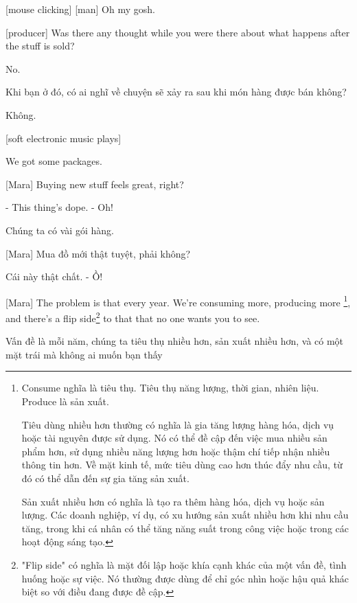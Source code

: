 \documentclass[a4paper]{article}
\begin{document}
	
	[mouse clicking] [man] Oh my gosh.
	
	[producer] Was there any thought while you were there about what happens after the stuff is sold?
	
	No.
	
	\begin{vietnamese-v2}
		Khi bạn ở đó, có ai nghĩ về chuyện sẽ xảy ra sau khi món hàng được bán không?
		
		Không.
	\end{vietnamese-v2}
	
	[soft electronic music plays]
	
	We got some packages.
	
	[Mara] Buying new stuff feels great, right?
	
	- This thing's dope. - Oh!
	
	\begin{vietnamese-v2}
		
		Chúng ta có vài gói hàng.
		
		[Mara] Mua đồ mới thật tuyệt, phải không?
		
		Cái này thật chất. - Ồ!
	\end{vietnamese-v2}
	
	[Mara] The problem is that every year. We're consuming more, producing more \footnote{
		Consume nghĩa là tiêu thụ. Tiêu thụ năng lượng, thời gian, nhiên liệu. Produce là sản xuất.
		
		Tiêu dùng nhiều hơn thường có nghĩa là gia tăng lượng hàng hóa, dịch vụ hoặc tài nguyên được sử dụng. Nó có thể đề cập đến việc mua nhiều sản phẩm hơn, sử dụng nhiều năng lượng hơn hoặc thậm chí tiếp nhận nhiều thông tin hơn. Về mặt kinh tế, mức tiêu dùng cao hơn thúc đẩy nhu cầu, từ đó có thể dẫn đến sự gia tăng sản xuất.
		
		Sản xuất nhiều hơn có nghĩa là tạo ra thêm hàng hóa, dịch vụ hoặc sản lượng. Các doanh nghiệp, ví dụ, có xu hướng sản xuất nhiều hơn khi nhu cầu tăng, trong khi cá nhân có thể tăng năng suất trong công việc hoặc trong các hoạt động sáng tạo.
	}, and there's a flip side\footnote{
		"Flip side" có nghĩa là mặt đối lập hoặc khía cạnh khác của một vấn đề, tình huống hoặc sự việc. Nó thường được dùng để chỉ góc nhìn hoặc hậu quả khác biệt so với điều đang được đề cập.
		
	} to that that no one wants you to see.
	
	\begin{vietnamese-v2}
		[Mara] Vấn đề là mỗi năm, chúng ta tiêu thụ nhiều hơn, sản xuất nhiều hơn, và có một mặt trái mà không ai muốn bạn thấy
	\end{vietnamese-v2}
	
\end{document}
